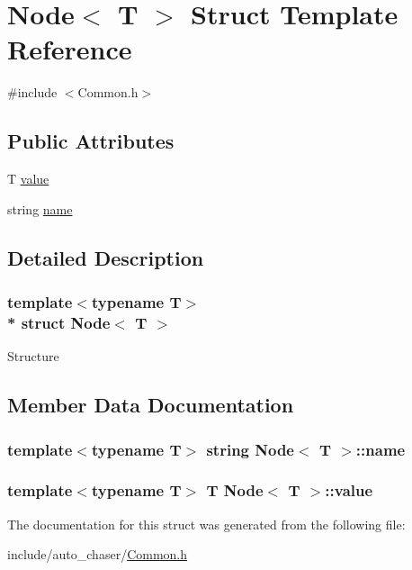\hypertarget{struct_node}{}\section{Node$<$ T $>$ Struct Template Reference}
\label{struct_node}


{\ttfamily \#include $<$Common.\+h$>$}

\subsection*{Public Attributes}
\begin{DoxyCompactItemize}
\item 
T \hyperlink{struct_node_a01b9071c0de774c720b64583262d1559}{value}
\item 
string \hyperlink{struct_node_a795bdc93cbf63ccddcdf2168d858492c}{name}
\end{DoxyCompactItemize}


\subsection{Detailed Description}
\subsubsection*{template$<$typename T$>$\\*
struct Node$<$ T $>$}

Structure 

\subsection{Member Data Documentation}
\subsubsection[{\texorpdfstring{name}{name}}]{\setlength{\rightskip}{0pt plus 5cm}template$<$typename T$>$ string {\bf Node}$<$ T $>$\+::name}\hypertarget{struct_node_a795bdc93cbf63ccddcdf2168d858492c}{}\label{struct_node_a795bdc93cbf63ccddcdf2168d858492c}
\subsubsection[{\texorpdfstring{value}{value}}]{\setlength{\rightskip}{0pt plus 5cm}template$<$typename T$>$ T {\bf Node}$<$ T $>$\+::value}\hypertarget{struct_node_a01b9071c0de774c720b64583262d1559}{}\label{struct_node_a01b9071c0de774c720b64583262d1559}


The documentation for this struct was generated from the following file\+:\begin{DoxyCompactItemize}
\item 
include/auto\+\_\+chaser/\hyperlink{_common_8h}{Common.\+h}\end{DoxyCompactItemize}
